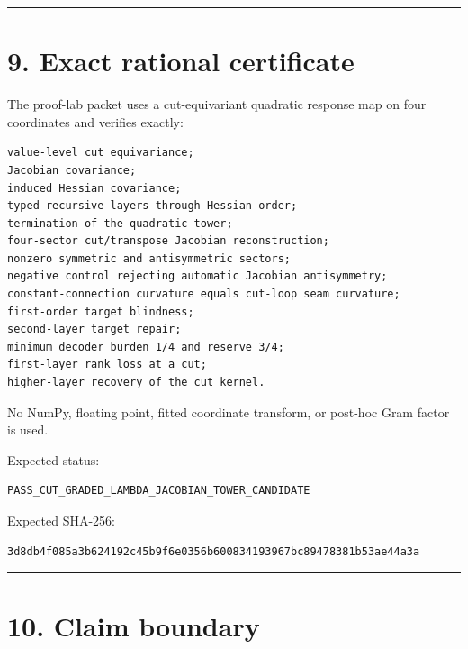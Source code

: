 \begin{center}\rule{0.5\linewidth}{0.5pt}\end{center}

\hypertarget{exact-rational-certificate}{%
\section{9. Exact rational certificate}\label{exact-rational-certificate}}

The proof-lab packet uses a cut-equivariant quadratic response map on four
coordinates and verifies exactly:

\begin{verbatim}
value-level cut equivariance;
Jacobian covariance;
induced Hessian covariance;
typed recursive layers through Hessian order;
termination of the quadratic tower;
four-sector cut/transpose Jacobian reconstruction;
nonzero symmetric and antisymmetric sectors;
negative control rejecting automatic Jacobian antisymmetry;
constant-connection curvature equals cut-loop seam curvature;
first-order target blindness;
second-layer target repair;
minimum decoder burden 1/4 and reserve 3/4;
first-layer rank loss at a cut;
higher-layer recovery of the cut kernel.
\end{verbatim}

No NumPy, floating point, fitted coordinate transform, or post-hoc Gram factor
is used.

Expected status:

\begin{verbatim}
PASS_CUT_GRADED_LAMBDA_JACOBIAN_TOWER_CANDIDATE
\end{verbatim}

Expected SHA-256:

\begin{verbatim}
3d8db4f085a3b624192c45b9f6e0356b600834193967bc89478381b53ae44a3a
\end{verbatim}

\begin{center}\rule{0.5\linewidth}{0.5pt}\end{center}

\hypertarget{claim-boundary}{%
\section{10. Claim boundary}\label{claim-boundary}}

